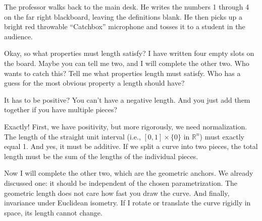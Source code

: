 \begin{nice-box}
The professor walks back to the main desk. He writes the numbers 1 through 4 on the far right blackboard, leaving the definitions blank. He then picks up a bright red throwable ``Catchbox'' microphone and tosses it to a student in the audience.
\end{nice-box}

\begin{spoken-clean}[00:12:30 - 00:13:15]
Okay, so what properties must length satisfy? I have written four empty slots on the board. Maybe you can tell me two, and I will complete the other two. Who wants to catch this? Tell me what properties length must satisfy. Who has a guess for the most obvious property a length should have?
\end{spoken-clean}

\begin{student-question}
It has to be positive? You can't have a negative length. And you just add them together if you have multiple pieces?
\end{student-question}

\begin{spoken-clean}[00:13:15 - 00:14:15]
Exactly! First, we have positivity, but more rigorously, we need normalization. The length of the straight unit interval (i.e., $[0,1] \times \{0\}$ in $\mathbb{R}^n$) must exactly equal 1. And yes, it must be additive. If we split a curve into two pieces, the total length must be the sum of the lengths of the individual pieces. 
\end{spoken-clean}

\begin{spoken-clean}[00:14:15 - 00:15:00]
Now I will complete the other two, which are the geometric anchors. We already discussed one: it should be independent of the chosen parametrization. The geometric length does not care how fast you draw the curve. And finally, invariance under Euclidean isometry. If I rotate or translate the curve rigidly in space, its length cannot change.
\end{spoken-clean}

